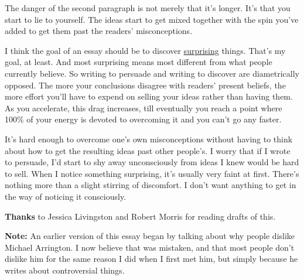 \documentclass[12pt]{book}
\begin{document}
The danger of the second paragraph is not merely that it's longer. It's
that you start to lie to yourself. The ideas start to get mixed together
with the spin you've added to get them past the readers' misconceptions.

I think the goal of an essay should be to discover
\href{essay.html}{surprising} things. That's my goal, at least. And most
surprising means most different from what people currently believe. So
writing to persuade and writing to discover are diametrically opposed.
The more your conclusions disagree with readers' present beliefs, the
more effort you'll have to expend on selling your ideas rather than
having them. As you accelerate, this drag increases, till eventually you
reach a point where 100\% of your energy is devoted to overcoming it and
you can't go any faster.

It's hard enough to overcome one's own misconceptions without having to
think about how to get the resulting ideas past other people's. I worry
that if I wrote to persuade, I'd start to shy away unconsciously from
ideas I knew would be hard to sell. When I notice something surprising,
it's usually very faint at first. There's nothing more than a slight
stirring of discomfort. I don't want anything to get in the way of
noticing it consciously.


\textbf{Thanks} to Jessica Livingston and Robert Morris for reading
drafts of this.

\textbf{Note:} An earlier version of this essay began by talking about
why people dislike Michael Arrington. I now believe that was mistaken,
and that most people don't dislike him for the same reason I did when I
first met him, but simply because he writes about controversial things.
\end{document}
